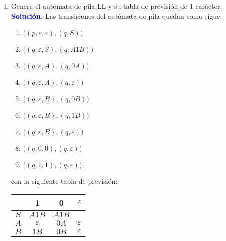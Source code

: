 \documentclass[11pt,fleqn]{article}
\newcommand{\solution}{\textcolor{blue}{\textbf{Solución. }}}
\begin{document}
\begin{enumerate}
\begin{enumerate}
        \item Genera el autómata de pila LL y su tabla de previsión de 1 carácter. \\
        \solution Las transiciones del autómata de pila quedan como sigue:
        \begin{enumerate}[label=\arabic*.-, leftmargin=15mm]
            \item $\big((p,\varepsilon,\varepsilon),(q,S)\big)$
            \item $\big((q,\varepsilon,S),(q,A1B)\big)$
            \item $\big((q,\varepsilon,A),(q,0A)\big)$
            \item $\big((q,\varepsilon,A),(q,\varepsilon)\big)$
            \item $\big((q,\varepsilon,B),(q,0B)\big)$
            \item $\big((q,\varepsilon,B),(q,1B)\big)$
            \item $\big((q,\varepsilon,B),(q,\varepsilon)\big)$
            \item $\big((q,0,0),(q,\varepsilon)\big)$
            \item $\big((q,1,1),(q,\varepsilon)\big),$ 
        \end{enumerate}

        con la siguiente tabla de previsión:
        \begin{center}
            \begin{tabular}{c|c|c|c}
                    & 1 & 0 & $\varepsilon$ \\ 
                \hline 
                $S$ & $A1B$ & $A1B$ &   \\ 
                \hline 
                $A$ & $\varepsilon$ & $0A$ & $\varepsilon$ \\ 
                \hline 
                $B$ & $1B$ & $0B$ & $\varepsilon$ \\ 
                \hline 
            \end{tabular} 
        \end{center}        \newpage
        

\end{enumerate}
\end{enumerate}
\end{document}
